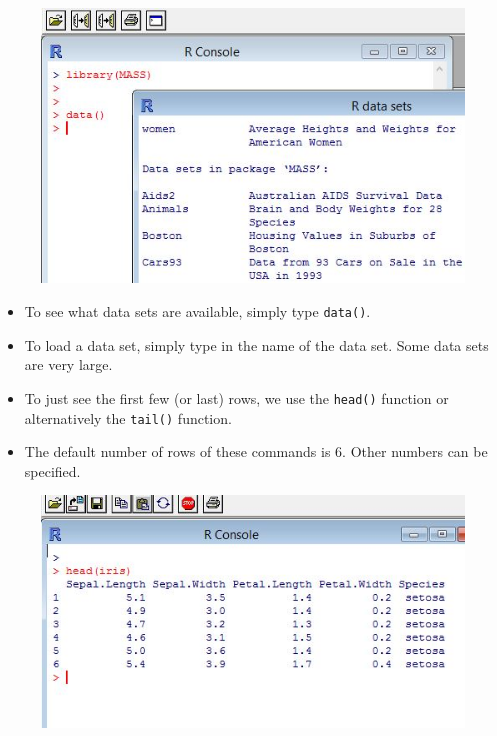 \documentclass{beamer}
\begin{document}
 \begin{frame}
 	\begin{figure}
 		\centering
 		\includegraphics[width=0.7\linewidth]{images/RdatasetsMore}   
 	\end{figure}
 \end{frame}   
 \begin{frame}
 	
 	\begin{itemize}
 		\item To see what data sets are available, simply type \texttt{data()}.
 		\item  To load a data set, simply type in the
 		name of the data set. Some data sets are very large.
 		\item  To just see the first few (or last) rows, we
 		use the \texttt{head()} function or alternatively the \texttt{tail()} function. 
 		\item The default number of rows of
 		these commands is 6. Other numbers can be specified.
 	\end{itemize}
 	
 \end{frame}
 \begin{frame}
 	\begin{figure}
 		\centering 
 		\includegraphics[width=0.7\linewidth]{images/irishead}      
 	\end{figure}
 \end{frame}   
\end{document}
